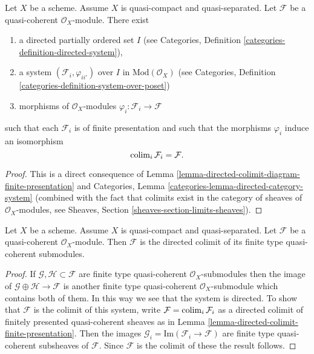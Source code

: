 \begin{lemma}
\label{lemma-directed-colimit-finite-presentation}
Let $X$ be a scheme. Assume $X$ is quasi-compact and quasi-separated.
Let $\mathcal{F}$ be a quasi-coherent $\mathcal{O}_X$-module.
There exist
\begin{enumerate}
\item a directed partially ordered set $I$ (see
Categories, Definition \ref{categories-definition-directed-system}),
\item a system $(\mathcal{F}_i, \varphi_{ii'})$
over $I$ in $\text{Mod}(\mathcal{O}_X)$ (see
Categories, Definition \ref{categories-definition-system-over-poset})
\item morphisms of $\mathcal{O}_X$-modules
$\varphi_i : \mathcal{F}_i \to \mathcal{F}$
\end{enumerate}
such that each $\mathcal{F}_i$ is of finite presentation
and such that the morphisms $\varphi_i$ induce an isomorphism
$$
\mathop{\rm colim}\nolimits_i \mathcal{F}_i
=
\mathcal{F}.
$$
\end{lemma}

\begin{proof}
This is a direct consequence of
Lemma \ref{lemma-directed-colimit-diagram-finite-presentation} and
Categories, Lemma \ref{categories-lemma-directed-category-system}
(combined with the fact that
colimits exist in the category of sheaves of $\mathcal{O}_X$-modules, see 
Sheaves, Section \ref{sheaves-section-limits-sheaves}).
\end{proof}

\begin{lemma}
\label{lemma-directed-colimit-finite-type}
Let $X$ be a scheme. Assume $X$ is quasi-compact and quasi-separated.
Let $\mathcal{F}$ be a quasi-coherent $\mathcal{O}_X$-module.
Then $\mathcal{F}$ is the directed colimit of its finite type
quasi-coherent submodules.
\end{lemma}

\begin{proof}
If $\mathcal{G}, \mathcal{H} \subset \mathcal{F}$ are finite type
quasi-coherent $\mathcal{O}_X$-submodules then the image
of $\mathcal{G} \oplus \mathcal{H} \to \mathcal{F}$ is another
finite type quasi-coherent $\mathcal{O}_X$-submodule which contains
both of them. In this way we see that the system is directed.
To show that $\mathcal{F}$ is the colimit of this system, write
$\mathcal{F} = \mathop{\rm colim}\nolimits_i \mathcal{F}_i$ as a directed
colimit of finitely presented quasi-coherent sheaves as in
Lemma \ref{lemma-directed-colimit-finite-presentation}.
Then the images $\mathcal{G}_i = \text{Im}(\mathcal{F}_i \to \mathcal{F})$ are
finite type quasi-coherent subsheaves of $\mathcal{F}$. Since
$\mathcal{F}$ is the colimit of these the result follows.
\end{proof}

